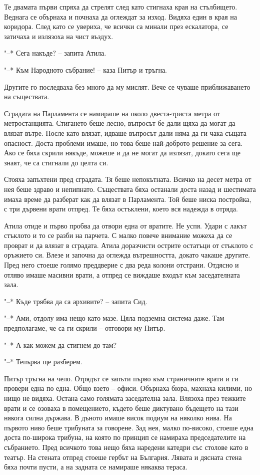 \documentclass[ebook,openany,12pt]{memoir}
\begin{document}
Те двамата първи спряха да стрелят след като стигнаха края на стълбището. Веднага се обърнаха и почнаха да оглеждат за изход. Видяха един в края на коридора. След като се увериха, че всички са минали през ескалатора, се затичаха и излязоха на чист въздух. 

"--* Сега накъде? -- запита Атила.

"--* Към Народното събрание! – каза Питър и тръгна.

Другите го последваха без много да му мислят. Вече се чуваше приближаването на съществата.

Сградата на Парламента се намираше на около две\-ста-триста метра от метростанцията. Стигането беше лесно, въпросът бе дали щяха да могат да влязат вътре. После като влязат, идваше въпросът дали няма да ги чака същата опасност. Доста проблеми имаше, но това беше най-доброто решение за сега. Ако се бяха скрили някъде, можеше и да не могат да излязат, докато сега ще знаят, че са стигнали до целта си.

Стояха запъхтени пред сградата. Тя беше непокътната. Всичко на десет метра от нея беше здраво и непипнато. Съществата бяха останали доста назад и шестимата имаха време да разберат как да влязат в Парламента. Той беше ниска постройка, с три дървени врати отпред. Те бяха остъклени, което вся надежда в отряда.

Атила отиде и първо пробва да отвори една от вратите. Не успя. Удари с лакът стъклото и то се разби на парчета. С малко повече внимание можеха да се проврат и да влязат в сградата. Атила доразчисти острите остатъци от стъклото с оръжието си. Влезе и започна да оглежда вътрешността, докато чакаше другите. Пред него стоеше голямо преддверие с два реда колони отстрани. Отдясно и отляво имаше масивни врати, а отпред се виждаше входът към заседателната зала.

"--* Къде трябва да са архивите? – запита Сид.

"--* Ами, отдолу има нещо като мазе. Цяла подземна система даже. Там предполагаме, че са ги скрили – отговори му Питър.

"--* А как можем да стигнем до там?

"--* Тепърва ще разберем.

Питър тръгна на чело. Отрядът се запъти първо към страничните врати и ги провери една по една. Общо взето – офиси. Обърнаха бюра, махнаха килими, но нищо не видяха. Остана само голямата заседателна зала. Влязоха през тежките врати и се озоваха в помещението, където беше диктувано бъдещето на тази някога силна държава. В дъното имаше висок подиум на няколко нива. На първото ниво беше трибуната за говорене. Зад нея, малко по-високо, стоеше една доста по-широка трибуна, на която по принцип се намираха председателите на събранието. Пред всичкото това нещо бяха наредени катедри със столове като в театър. На стената отпред стоеше гербът на България. Лявата и дясната стена бяха почти пусти, а на задната се намираше някаква тераса.
\end{document}
